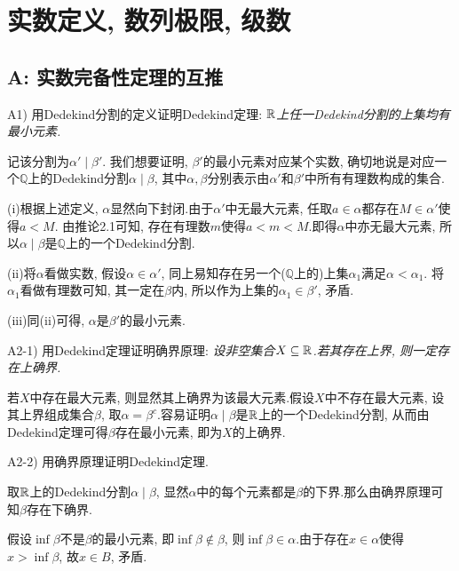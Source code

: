 \section{实数定义, 数列极限, 级数}

\subsection*{A: 实数完备性定理的互推}

A1) 用Dedekind分割的定义证明Dedekind定理: \textit{$\mathbb{R}$上任一Dedekind分割的上集均有最小元素. }

\begin{solution}
	记该分割为$\alpha ' \mid \beta '$. 我们想要证明, $\beta '$的最小元素对应某个实数, 确切地说是对应一个$\mathbb{Q}$上的Dedekind分割$\alpha \mid \beta$, 其中$\alpha , \beta$分别表示由$\alpha '$和$\beta '$中所有有理数构成的集合.
	
	(i)根据上述定义, $\alpha$显然向下封闭.由于$\alpha '$中无最大元素, 任取$a \in \alpha$都存在$M \in \alpha '$使得$a < M$. 由推论2.1可知, 存在有理数$m$使得$a<m<M$.即得$\alpha$中亦无最大元素, 所以$\alpha \mid \beta$是$\mathbb{Q}$上的一个Dedekind分割.
	
	(ii)将$\alpha$看做实数, 假设$\alpha \in \alpha '$, 同上易知存在另一个($\mathbb{Q}$上的)上集$\alpha _1$满足$\alpha < \alpha _1$. 将$\alpha _1$看做有理数可知, 其一定在$\beta$内, 所以作为上集的$\alpha _1 \in \beta '$, 矛盾.
	
	(iii)同(ii)可得, $\alpha$是$\beta '$的最小元素.
\end{solution}

A2-1) 用Dedekind定理证明确界原理: \textit{设非空集合$X \subseteq \mathbb{R}$.若其存在上界, 则一定存在上确界. }

\begin{solution}
	若$X$中存在最大元素, 则显然其上确界为该最大元素.假设$X$中不存在最大元素, 设其上界组成集合$\beta$, 取$\alpha = \beta ^c$.容易证明$\alpha \mid \beta$是$\mathbb{R}$上的一个Dedekind分割, 从而由Dedekind定理可得$\beta$存在最小元素, 即为$X$的上确界.
\end{solution}

A2-2) 用确界原理证明Dedekind定理. 

\begin{solution}
	取$\mathbb{R}$上的Dedekind分割$\alpha \mid \beta$, 显然$\alpha$中的每个元素都是$\beta$的下界.那么由确界原理可知$\beta$存在下确界.
	
	假设$\inf \beta$不是$\beta$的最小元素, 即$\inf \beta \notin \beta$, 则$\inf \beta \in \alpha$.由于存在$x \in \alpha$使得$x > \inf \beta$, 故$x \in B$, 矛盾. 
\end{solution}

